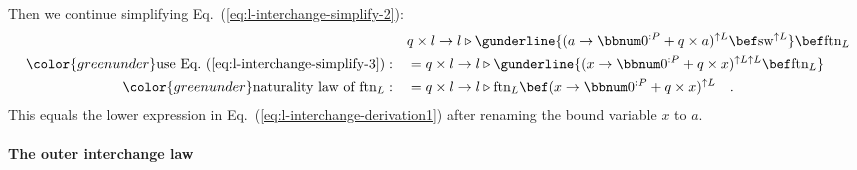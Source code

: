 Then we continue simplifying Eq.~(\ref{eq:l-interchange-simplify-2}):
\begin{align*}
 & q\times l\rightarrow l\triangleright\gunderline{(a\rightarrow\bbnum 0^{:P}+q\times a)^{\uparrow L}\bef\text{sw}^{\uparrow L}}\bef\text{ftn}_{L}\\
{\color{greenunder}\text{use Eq.~(\ref{eq:l-interchange-simplify-3})}:}\quad & =q\times l\rightarrow l\triangleright\gunderline{(x\rightarrow\bbnum 0^{:P}+q\times x)^{\uparrow L\uparrow L}\bef\text{ftn}_{L}}\\
{\color{greenunder}\text{naturality law of }\text{ftn}_{L}:}\quad & =q\times l\rightarrow l\triangleright\text{ftn}_{L}\bef(x\rightarrow\bbnum 0^{:P}+q\times x)^{\uparrow L}\quad.
\end{align*}
This equals the lower expression in Eq.~(\ref{eq:l-interchange-derivation1})
after renaming the bound variable $x$ to $a$.

\paragraph{The outer interchange law}

